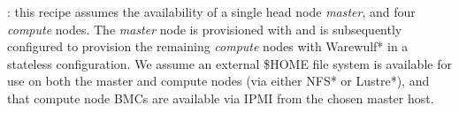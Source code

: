 : this recipe assumes the availability of a single head node
{\em master}, and four {\em compute} nodes. The {\em master} node is
provisioned with \baseOS{} and is subsequently configured to provision the
remaining {\em compute} nodes with Warewulf* in a stateless configuration. We
assume an external \$HOME file system is available for use on both the master
and compute nodes (via either NFS* or Lustre*), and that compute node BMCs are
available via IPMI from the chosen master host.
